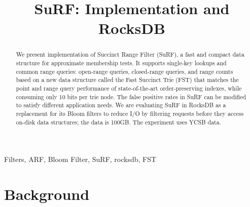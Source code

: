 \documentclass[12pt,conference]{IEEEtran}
\begin{document}
\title{SuRF: Implementation and RocksDB }

\author{
\and
{}
}





\maketitle



\begin{abstract}
We present implementation of  Succinct Range Filter (SuRF), a fast and compact data
structure for approximate membership tests. It supports  single-key lookups and common
range queries: open-range queries, closed-range queries, and range
counts based on a new data structure called the Fast Succinct
Trie (FST) that matches the point and range query performance of
state-of-the-art order-preserving indexes, while consuming only
10 bits per trie node. The false positive rates in SuRF can be modified to satisfy different application needs.
We are evaluating SuRF in RocksDB as a replacement for its Bloom filters
to reduce I/O  by filtering requests before they access on-disk data
structures; the data is 100GB. The experiment uses YCSB data.
\end{abstract}

\begin{IEEEkeywords}
Filters, ARF, Bloom Filter, SuRF, rocksdb, FST
\end{IEEEkeywords}

\IEEEpeerreviewmaketitle



\section{Background}
\end{document}

